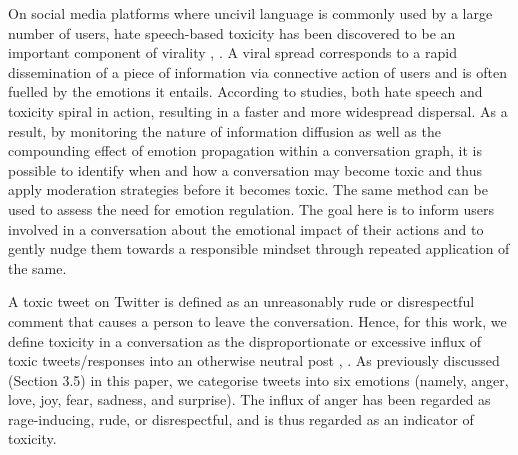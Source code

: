 \documentclass[acmtog]{acmart}
\begin{document}
On social media platforms where uncivil language is commonly used by a large number of users, hate speech-based toxicity has been discovered to be an important component of virality \cite{maarouf2022virality}, \cite{goel2016structural}. A viral spread corresponds to a rapid dissemination of a piece of information via connective action of users and is often fuelled by the emotions it entails. According to studies, both hate speech and toxicity spiral in action, resulting in a faster and more widespread dispersal. As a result, by monitoring the nature of information diffusion as well as the compounding effect of emotion propagation within a conversation graph, it is possible to identify when and how a conversation may become toxic and thus apply moderation strategies before it becomes toxic. The same method can be used to assess the need for emotion regulation. The goal here is to inform users involved in a conversation about the emotional impact of their actions and to gently nudge them towards a responsible mindset through repeated application of the same.

A toxic tweet on Twitter is defined as an unreasonably rude or disrespectful comment that causes a person to leave the conversation. Hence, for this work, we define toxicity in a conversation as the disproportionate or excessive influx of toxic tweets/responses into an otherwise neutral post \cite{aroyo2019crowdsourcing}, \cite{xenos2021toxicity}. As previously discussed (Section 3.5) in this paper, we categorise tweets into six emotions (namely, anger, love, joy, fear, sadness, and surprise). The influx of anger has been regarded as rage-inducing, rude, or disrespectful, and is thus regarded as an indicator of toxicity.
\end{document}
